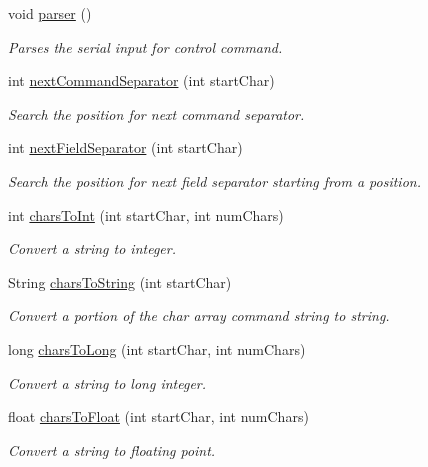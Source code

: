 \begin{DoxyCompactItemize}
void \hyperlink{_meditech___chip_kit_control_panel_8pde_ac15f7c36f6055edec43d0f0f611c4dc0}{parser} ()
\begin{DoxyCompactList}\small\item\em Parses the serial input for control command. \end{DoxyCompactList}\item 
int \hyperlink{_meditech___chip_kit_control_panel_8pde_a4b62bbf3dd6cf7eb7fee557932fd1b7c}{next\-Command\-Separator} (int start\-Char)
\begin{DoxyCompactList}\small\item\em Search the position for next command separator. \end{DoxyCompactList}\item 
int \hyperlink{_meditech___chip_kit_control_panel_8pde_a6b0edf09b0e4b4ed48c9213d14d27efa}{next\-Field\-Separator} (int start\-Char)
\begin{DoxyCompactList}\small\item\em Search the position for next field separator starting from a position. \end{DoxyCompactList}\item 
int \hyperlink{_meditech___chip_kit_control_panel_8pde_ad893e606e19944faa6540bba9387370f}{chars\-To\-Int} (int start\-Char, int num\-Chars)
\begin{DoxyCompactList}\small\item\em Convert a string to integer. \end{DoxyCompactList}\item 
String \hyperlink{_meditech___chip_kit_control_panel_8pde_af256eb98be4447dd754239d6c5cf4792}{chars\-To\-String} (int start\-Char)
\begin{DoxyCompactList}\small\item\em Convert a portion of the char array command string to string. \end{DoxyCompactList}\item 
long \hyperlink{_meditech___chip_kit_control_panel_8pde_ac6fe1eb1fb2d6c60ea6e06cacfa0fda7}{chars\-To\-Long} (int start\-Char, int num\-Chars)
\begin{DoxyCompactList}\small\item\em Convert a string to long integer. \end{DoxyCompactList}\item 
float \hyperlink{_meditech___chip_kit_control_panel_8pde_ab87a8658559acd359f0eeec0e64a5af6}{chars\-To\-Float} (int start\-Char, int num\-Chars)
\begin{DoxyCompactList}\small\item\em Convert a string to floating point. \end{DoxyCompactList}\item 

\end{DoxyCompactItemize}
